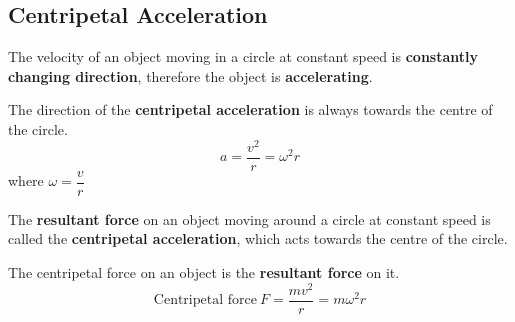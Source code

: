 \subsection{Centripetal Acceleration}

The velocity of an object moving in a circle at constant speed is \textbf{constantly changing direction}, therefore the object is \textbf{accelerating}.

The direction of the \textbf{centripetal acceleration} is always towards the centre of the circle.
$$a=\frac{v^2}{r}=\omega^2r$$
where $\omega=\dfrac{v}{r}$

The \textbf{resultant force} on an object moving around a circle at constant speed is called the \textbf{centripetal acceleration}, which acts towards the centre of the circle.

The centripetal force on an object is the \textbf{resultant force} on it.
$$\text{Centripetal force}\ F=\dfrac{mv^2}{r}=m\omega^2r$$
